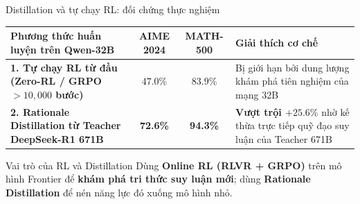 \begin{frame}{Distillation và tự chạy RL: đối chứng thực nghiệm}
  \vspace{0.06cm}
  \small
  \renewcommand{\arraystretch}{1.18}
  \begin{tabularx}{\textwidth}{@{}>{\raggedright\arraybackslash}X c c >{\raggedright\arraybackslash}X@{}}
    \toprule
    \textbf{Phương thức huấn luyện trên Qwen-32B} & \textbf{AIME 2024} & \textbf{MATH-500} & \textbf{Giải thích cơ chế} \\
    \midrule
    \textbf{1. Tự chạy RL từ đầu (Zero-RL / GRPO $>10{,}000$ bước)} & $47.0\%$ & $83.9\%$ & Bị giới hạn bởi dung lượng khám phá tiên nghiệm của mạng 32B \\

    \textbf{2. Rationale Distillation từ Teacher DeepSeek-R1 671B} & \textbf{\textcolor{tealgreen}{72.6\%}} & \textbf{\textcolor{tealgreen}{94.3\%}} & \textbf{Vượt trội $+25.6\%$} nhờ kế thừa trực tiếp quỹ đạo suy luận của Teacher 671B \\
    \bottomrule
  \end{tabularx}

  \vspace{0.12cm}
  \begin{exampleblock}{Vai trò của RL và Distillation}
    \small
    Dùng \textbf{Online RL (RLVR + GRPO)} trên mô hình Frontier để \textbf{khám phá tri thức suy luận mới}; dùng \textbf{Rationale Distillation} để nén năng lực đó xuống mô hình nhỏ.
  \end{exampleblock}
  \par\vspace{0pt}
\end{frame}

